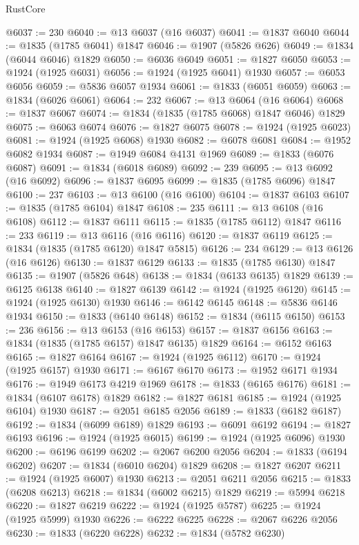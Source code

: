 \begin{lexlean}{RustCore}
\begin{coremodule}
@6037 := 230
@6040 := @13 @6037 (@16 @6037)
@6041 := @1837 @6040
@6044 := @1835 (@1785 @6041) @1847
@6046 := @1907 (@5826 @626)
@6049 := @1834 (@6044 @6046) @1829
@6050 := @6036 @6049
@6051 := @1827 @6050
@6053 := @1924 (@1925 @6031)
@6056 := @1924 (@1925 @6041) @1930
@6057 := @6053 @6056
@6059 := @5836 @6057 @1934
@6061 := @1833 (@6051 @6059)
@6063 := @1834 (@6026 @6061)
@6064 := 232
@6067 := @13 @6064 (@16 @6064)
@6068 := @1837 @6067
@6074 := @1834 (@1835 (@1785 @6068) @1847 @6046) @1829
@6075 := @6063 @6074
@6076 := @1827 @6075
@6078 := @1924 (@1925 @6023)
@6081 := @1924 (@1925 @6068) @1930
@6082 := @6078 @6081
@6084 := @1952 @6082 @1934
@6087 := @1949 @6084 @4131 @1969
@6089 := @1833 (@6076 @6087)
@6091 := @1834 (@6018 @6089)
@6092 := 239
@6095 := @13 @6092 (@16 @6092)
@6096 := @1837 @6095
@6099 := @1835 (@1785 @6096) @1847
@6100 := 237
@6103 := @13 @6100 (@16 @6100)
@6104 := @1837 @6103
@6107 := @1835 (@1785 @6104) @1847
@6108 := 235
@6111 := @13 @6108 (@16 @6108)
@6112 := @1837 @6111
@6115 := @1835 (@1785 @6112) @1847
@6116 := 233
@6119 := @13 @6116 (@16 @6116)
@6120 := @1837 @6119
@6125 := @1834 (@1835 (@1785 @6120) @1847 @5815)
@6126 := 234
@6129 := @13 @6126 (@16 @6126)
@6130 := @1837 @6129
@6133 := @1835 (@1785 @6130) @1847
@6135 := @1907 (@5826 @648)
@6138 := @1834 (@6133 @6135) @1829
@6139 := @6125 @6138
@6140 := @1827 @6139
@6142 := @1924 (@1925 @6120)
@6145 := @1924 (@1925 @6130) @1930
@6146 := @6142 @6145
@6148 := @5836 @6146 @1934
@6150 := @1833 (@6140 @6148)
@6152 := @1834 (@6115 @6150)
@6153 := 236
@6156 := @13 @6153 (@16 @6153)
@6157 := @1837 @6156
@6163 := @1834 (@1835 (@1785 @6157) @1847 @6135) @1829
@6164 := @6152 @6163
@6165 := @1827 @6164
@6167 := @1924 (@1925 @6112)
@6170 := @1924 (@1925 @6157) @1930
@6171 := @6167 @6170
@6173 := @1952 @6171 @1934
@6176 := @1949 @6173 @4219 @1969
@6178 := @1833 (@6165 @6176)
@6181 := @1834 (@6107 @6178) @1829
@6182 := @1827 @6181
@6185 := @1924 (@1925 @6104) @1930
@6187 := @2051 @6185 @2056
@6189 := @1833 (@6182 @6187)
@6192 := @1834 (@6099 @6189) @1829
@6193 := @6091 @6192
@6194 := @1827 @6193
@6196 := @1924 (@1925 @6015)
@6199 := @1924 (@1925 @6096) @1930
@6200 := @6196 @6199
@6202 := @2067 @6200 @2056
@6204 := @1833 (@6194 @6202)
@6207 := @1834 (@6010 @6204) @1829
@6208 := @1827 @6207
@6211 := @1924 (@1925 @6007) @1930
@6213 := @2051 @6211 @2056
@6215 := @1833 (@6208 @6213)
@6218 := @1834 (@6002 @6215) @1829
@6219 := @5994 @6218
@6220 := @1827 @6219
@6222 := @1924 (@1925 @5787)
@6225 := @1924 (@1925 @5999) @1930
@6226 := @6222 @6225
@6228 := @2067 @6226 @2056
@6230 := @1833 (@6220 @6228)
@6232 := @1834 (@5782 @6230)

\end{coremodule}
\end{lexlean}
